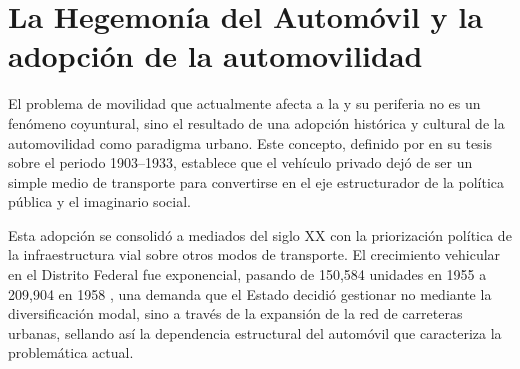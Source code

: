 \section{La Hegemonía del Automóvil y la adopción de la automovilidad}
\label{sec:hegemonia-automovil}

El problema de movilidad que actualmente afecta a la \cdmx{} y su periferia no
es un fenómeno coyuntural, sino el resultado de una adopción histórica y
cultural de la automovilidad como paradigma urbano. Este concepto, definido por
\citet{franco2022} en su tesis sobre el periodo 1903--1933, establece que el
vehículo privado dejó de ser un simple medio de transporte para convertirse en
el eje estructurador de la política pública y el imaginario social.

Esta adopción se consolidó a mediados del siglo XX con la priorización política
de la infraestructura vial sobre otros modos de transporte. El crecimiento
vehicular en el Distrito Federal fue exponencial, pasando de 150,584 unidades en
1955 a 209,904 en 1958 \citep{perlo2023}, una demanda que el Estado decidió
gestionar no mediante la diversificación modal, sino a través de la expansión de
la red de carreteras urbanas, sellando así la dependencia estructural del
automóvil que caracteriza la problemática actual.

